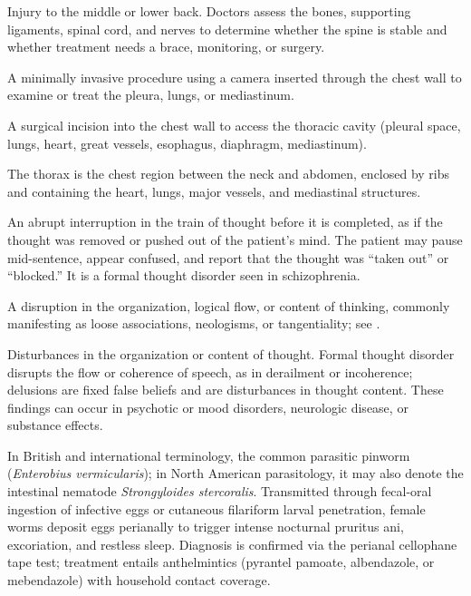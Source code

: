  Injury to the middle or lower back. Doctors assess the bones, supporting ligaments, spinal cord, and nerves to determine whether the spine is stable and whether treatment needs a brace, monitoring, or surgery.

 A minimally invasive procedure using a camera inserted through the chest wall to examine or treat the pleura, lungs, or mediastinum.

 A surgical incision into the chest wall to access the thoracic cavity (pleural space,
lungs, heart, great vessels, esophagus, diaphragm, mediastinum).

 The thorax is the chest region between the neck and abdomen, enclosed by ribs and containing the heart, lungs, major vessels, and mediastinal structures.

 An abrupt interruption in the train of thought before it is completed, as if the thought
was removed or pushed out of the patient's mind. The patient may pause mid-sentence,
appear confused, and report that the thought was ``taken out'' or ``blocked.'' It is a
formal thought disorder seen in schizophrenia.

 A disruption in the organization, logical flow, or content of thinking, commonly manifesting as loose associations, neologisms, or tangentiality; see .

 Disturbances in the organization or content of thought. Formal thought disorder disrupts the flow or coherence of speech, as in derailment or incoherence; delusions are fixed false beliefs and are disturbances in thought content. These findings can occur in psychotic or mood disorders, neurologic disease, or substance effects.

 In British and international terminology, the common parasitic pinworm (\textit{Enterobius vermicularis}); in North American parasitology, it may also denote the intestinal nematode \textit{Strongyloides stercoralis}. Transmitted through fecal-oral ingestion of infective eggs or cutaneous filariform larval penetration, female worms deposit eggs perianally to trigger intense nocturnal pruritus ani, excoriation, and restless sleep. Diagnosis is confirmed via the perianal cellophane tape test; treatment entails anthelmintics (pyrantel pamoate, albendazole, or mebendazole) with household contact coverage.

